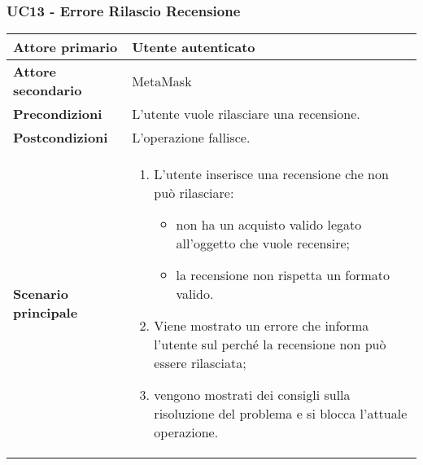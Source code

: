 \subsubsection{UC13 - Errore Rilascio Recensione}
\label{UC13}
\begin{center}
\renewcommand{\arraystretch}{1.5}
\begin{tabular}{ | m{10em} | m{20em} | }
    \hline
    \textbf{Attore primario} & Utente autenticato \\
    \hline
    \textbf{Attore secondario} & MetaMask \\
    \hline
    \textbf{Precondizioni} & L'utente vuole rilasciare una recensione. \\
    \hline
    \textbf{Postcondizioni} & L'operazione fallisce. \\
    \hline
    \textbf{Scenario principale} & \begin{enumerate}
        \item L'utente inserisce una recensione che non può rilasciare:
              \begin{itemize}
                  \item non ha un acquisto valido legato all'oggetto che vuole recensire;
                  \item la recensione non rispetta un formato valido.
              \end{itemize}
        \item Viene mostrato un errore che informa l'utente sul perché la recensione non può
              essere rilasciata;
        \item vengono mostrati dei consigli sulla risoluzione del problema e si blocca
              l'attuale operazione.
    \end{enumerate} \\
    \hline
   \end{tabular}
\end{center}

